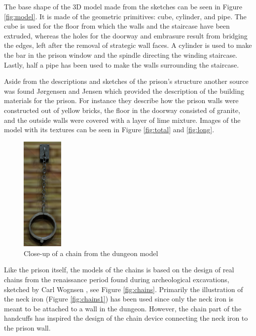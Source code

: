The base shape of the 3D model made from the sketches can be seen in Figure \ref{fig:model}. It is made of the geometric primitives: cube, cylinder, and pipe. The cube is used for the floor from which the walls and the staircase have been extruded, whereas the holes for the doorway and embrasure result from bridging the edges, left after the removal of strategic wall faces. A cylinder is used to make the bar in the prison window and the spindle directing the winding staircase. Lastly, half a pipe has been used to make the walls surrounding the staircase.%

Aside from the descriptions and sketches of the prison’s structure another source was found Jørgensen \cite{Jorgensen1934} and Jensen \cite{Jensen1909} which provided the description of the building materials for the prison. For instance they describe how the prison walls were constructed out of yellow bricks, the floor in the doorway consisted of granite, and the outside walls were covered with a layer of lime mixture. Images of the model with its textures can be seen in Figure \ref{fig:total} and \ref{fig:long}.

\begin{figure}
   \centering
   \includegraphics[width=0.18\textwidth]{figures/chainmodel.png}
   \caption{Close-up of a chain from the dungeon model}\label{fig:chain_model}
\end{figure}

Like the prison itself, the models of the chains is based on the design of real chains from the renaissance period found during archeological excavations, sketched by Carl Wognsen \cite{Riismoller1961}, see Figure \ref{fig:chains}. Primarily the illustration of the neck iron (Figure \ref{fig:chains1}) has been used since only the neck iron is meant to be attached to a wall in the dungeon. However, the chain part of the handcuffs has inspired the design of the chain device connecting the neck iron to the prison wall.

